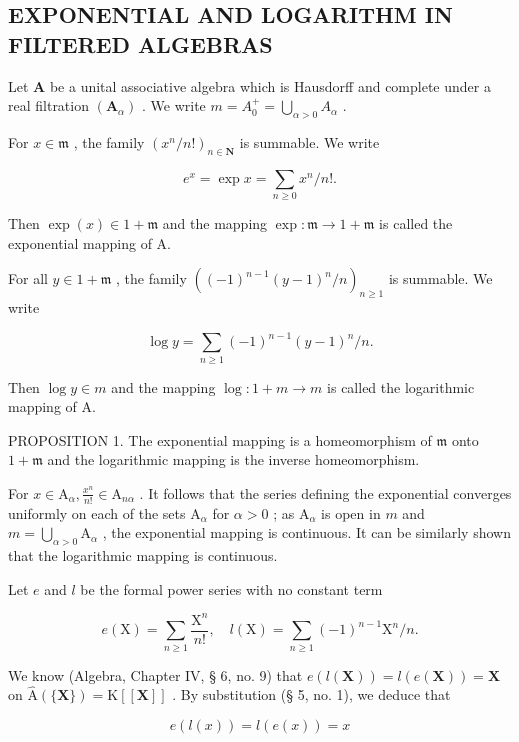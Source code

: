 \subsection{EXPONENTIAL AND LOGARITHM IN FILTERED ALGEBRAS}

Let \(\mathbf{A}\) be a unital associative algebra which is Hausdorff and complete under a real filtration \((\mathbf{A}_{\alpha})\) . We write \(m = A_0^+ = \bigcup_{\alpha > 0} A_\alpha\) .

For \(x \in \mathfrak{m}\) , the family \((x^n / n!)_{n \in \mathbf{N}}\) is summable. We write

\[
e ^ {x} = \exp x = \sum_ {n \geqslant 0} x ^ {n} / n!.\tag{1}
\]

Then \(\exp (x)\in 1 + \mathfrak{m}\) and the mapping \(\exp \colon \mathfrak{m}\to 1 + \mathfrak{m}\) is called the exponential mapping of A.

For all \(y \in 1 + \mathfrak{m}\) , the family \(((-1)^{n-1}(y - 1)^n / n)_{n \geqslant 1}\) is summable. We write

\[
\log y = \sum_ {n \geqslant 1} (- 1) ^ {n - 1} (y - 1) ^ {n} / n.\tag{2}
\]

Then \(\log y \in m\) and the mapping \(\log: 1 + m \to m\) is called the logarithmic mapping of A.

PROPOSITION 1. The exponential mapping is a homeomorphism of \(\mathfrak{m}\) onto \(1 + \mathfrak{m}\) and the logarithmic mapping is the inverse homeomorphism.

For \(x \in \mathrm{A}_{\alpha}, \frac{x^n}{n!} \in \mathrm{A}_{n\alpha}\) . It follows that the series defining the exponential converges uniformly on each of the sets \(\mathrm{A}_{\alpha}\) for \(\alpha > 0\) ; as \(\mathrm{A}_{\alpha}\) is open in \(m\) and \(m = \bigcup_{\alpha > 0} \mathrm{A}_{\alpha}\) , the exponential mapping is continuous. It can be similarly shown that the logarithmic mapping is continuous.

Let \(e\) and \(l\) be the formal power series with no constant term

\[
e (\mathrm{X}) = \sum_ {n \geqslant 1} \frac {\mathrm{X} ^ {n}}{n !}, \quad l (\mathrm{X}) = \sum_ {n \geqslant 1} (- 1) ^ {n - 1} \mathrm{X} ^ {n} / n.
\]

We know (Algebra, Chapter IV, § 6, no. 9) that \(e(l(\mathbf{X})) = l(e(\mathbf{X})) = \mathbf{X}\) on \(\hat{\mathrm{A}}(\{\mathbf{X}\}) = \mathrm{K}[[\mathbf{X}]]\) . By substitution (§ 5, no. 1), we deduce that

\[
e (l (x)) = l (e (x)) = x
\]

